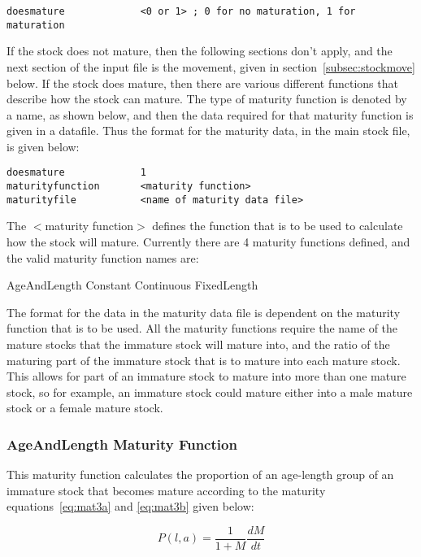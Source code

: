 \documentclass [a4paper, 10pt]{book}
\begin{document}
{\small\begin{verbatim}
doesmature             <0 or 1> ; 0 for no maturation, 1 for maturation
\end{verbatim}}

If the stock does not mature, then the following sections don't apply, and the next section of the input file is the movement, given in section~\ref{subsec:stockmove} below.  If the stock does mature, then there are various different functions that describe how the stock can mature.  The type of maturity function is denoted by a name, as shown below, and then the data required for that maturity function is given in a datafile.  Thus the format for the maturity data, in the main stock file, is given below:

{\small\begin{verbatim}
doesmature             1
maturityfunction       <maturity function>
maturityfile           <name of maturity data file>
\end{verbatim}}

The $<$maturity function$>$ defines the function that is to be used to calculate how the stock will mature.  Currently there are 4 maturity functions defined, and the valid maturity function names are:

\bigskip
AgeAndLength\newline
Constant\newline
Continuous\newline
FixedLength

\bigskip
The format for the data in the maturity data file is dependent on the maturity function that is to be used.  All the maturity functions require the name of the mature stocks that the immature stock will mature into, and the ratio of the maturing part of the immature stock that is to mature into each mature stock.  This allows for part of an immature stock to mature into more than one mature stock, so for example, an immature stock could mature either into a male mature stock or a female mature stock.

\subsubsection{AgeAndLength Maturity Function}
This maturity function calculates the proportion of an age-length group of an immature stock that becomes mature according to the maturity equations~\ref{eq:mat3a} and \ref{eq:mat3b} given below:

\begin{equation}\label{eq:mat3a}
P(l, a) = {\frac{1}{1 + M}}{\frac{dM}{dt}}
\end{equation}
\end{document}
